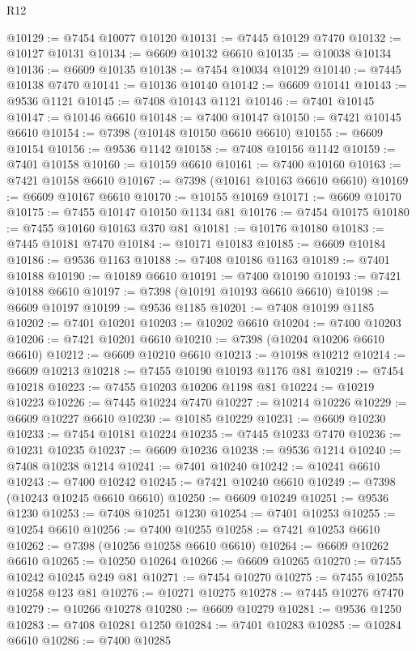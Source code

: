 \begin{lexlean}{R12}
\begin{coremodule}
@10129 := @7454 @10077 @10120
@10131 := @7445 @10129 @7470
@10132 := @10127 @10131
@10134 := @6609 @10132 @6610
@10135 := @10038 @10134
@10136 := @6609 @10135
@10138 := @7454 @10034 @10129
@10140 := @7445 @10138 @7470
@10141 := @10136 @10140
@10142 := @6609 @10141
@10143 := @9536 @1121
@10145 := @7408 @10143 @1121
@10146 := @7401 @10145
@10147 := @10146 @6610
@10148 := @7400 @10147
@10150 := @7421 @10145 @6610
@10154 := @7398 (@10148 @10150 @6610 @6610)
@10155 := @6609 @10154
@10156 := @9536 @1142
@10158 := @7408 @10156 @1142
@10159 := @7401 @10158
@10160 := @10159 @6610
@10161 := @7400 @10160
@10163 := @7421 @10158 @6610
@10167 := @7398 (@10161 @10163 @6610 @6610)
@10169 := @6609 @10167 @6610
@10170 := @10155 @10169
@10171 := @6609 @10170
@10175 := @7455 @10147 @10150 @1134 @81
@10176 := @7454 @10175
@10180 := @7455 @10160 @10163 @370 @81
@10181 := @10176 @10180
@10183 := @7445 @10181 @7470
@10184 := @10171 @10183
@10185 := @6609 @10184
@10186 := @9536 @1163
@10188 := @7408 @10186 @1163
@10189 := @7401 @10188
@10190 := @10189 @6610
@10191 := @7400 @10190
@10193 := @7421 @10188 @6610
@10197 := @7398 (@10191 @10193 @6610 @6610)
@10198 := @6609 @10197
@10199 := @9536 @1185
@10201 := @7408 @10199 @1185
@10202 := @7401 @10201
@10203 := @10202 @6610
@10204 := @7400 @10203
@10206 := @7421 @10201 @6610
@10210 := @7398 (@10204 @10206 @6610 @6610)
@10212 := @6609 @10210 @6610
@10213 := @10198 @10212
@10214 := @6609 @10213
@10218 := @7455 @10190 @10193 @1176 @81
@10219 := @7454 @10218
@10223 := @7455 @10203 @10206 @1198 @81
@10224 := @10219 @10223
@10226 := @7445 @10224 @7470
@10227 := @10214 @10226
@10229 := @6609 @10227 @6610
@10230 := @10185 @10229
@10231 := @6609 @10230
@10233 := @7454 @10181 @10224
@10235 := @7445 @10233 @7470
@10236 := @10231 @10235
@10237 := @6609 @10236
@10238 := @9536 @1214
@10240 := @7408 @10238 @1214
@10241 := @7401 @10240
@10242 := @10241 @6610
@10243 := @7400 @10242
@10245 := @7421 @10240 @6610
@10249 := @7398 (@10243 @10245 @6610 @6610)
@10250 := @6609 @10249
@10251 := @9536 @1230
@10253 := @7408 @10251 @1230
@10254 := @7401 @10253
@10255 := @10254 @6610
@10256 := @7400 @10255
@10258 := @7421 @10253 @6610
@10262 := @7398 (@10256 @10258 @6610 @6610)
@10264 := @6609 @10262 @6610
@10265 := @10250 @10264
@10266 := @6609 @10265
@10270 := @7455 @10242 @10245 @249 @81
@10271 := @7454 @10270
@10275 := @7455 @10255 @10258 @123 @81
@10276 := @10271 @10275
@10278 := @7445 @10276 @7470
@10279 := @10266 @10278
@10280 := @6609 @10279
@10281 := @9536 @1250
@10283 := @7408 @10281 @1250
@10284 := @7401 @10283
@10285 := @10284 @6610
@10286 := @7400 @10285

\end{coremodule}
\end{lexlean}

